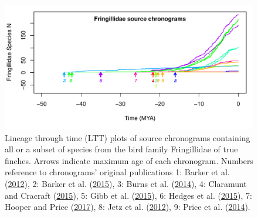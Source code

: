 \documentclass[
  english,
  man]{apa6}
\begin{document}
%
\newpage
\begin{figure}[!h]
\includegraphics[width=1\linewidth]{../figures/fig_schronograms1.pdf}
\caption{Lineage through time (LTT) plots of source chronograms containing all or a subset of species from the bird family Fringillidae of true finches. Arrows indicate maximum age of each chronogram. Numbers reference to chronograms' original publications 1: Barker et al. (\protect\hyperlink{ref-barker2012going}{2012}), 2: Barker et al. (\protect\hyperlink{ref-barker2015new}{2015}), 3: Burns et al. (\protect\hyperlink{ref-burns2014phylogenetics}{2014}), 4: Claramunt and Cracraft (\protect\hyperlink{ref-claramunt2015new}{2015}), 5: Gibb et al. (\protect\hyperlink{ref-gibb2015new}{2015}), 6: Hedges et al. (\protect\hyperlink{ref-Hedges2015}{2015}), 7: Hooper and Price (\protect\hyperlink{ref-hooper2017chromosomal}{2017}), 8: Jetz et al. (\protect\hyperlink{ref-Jetz2012}{2012}), 9: Price et al. (\protect\hyperlink{ref-price2014niche}{2014}).
}
\label{fig:schronograms1}
\end{figure}
\end{document}
